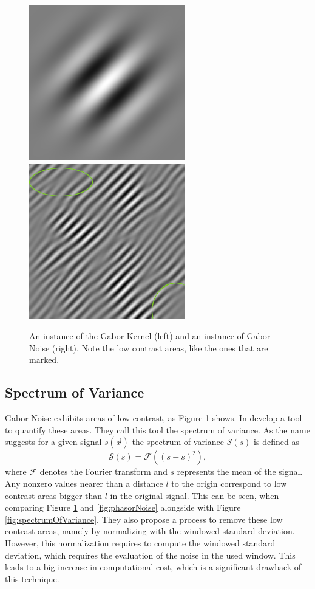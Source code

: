 \documentclass{utue} %
\begin{document}
\begin{figure}[ht]
  \centering
  \includegraphics[width=0.49\linewidth]{images/gaborKernel}
  \includegraphics[width=0.49\linewidth]{images/gaborNoise}
  \caption{An instance of the Gabor Kernel (left) and an instance of Gabor Noise (right). Note the low contrast areas, like the ones that are marked.}\label{fig:gaborNoise}

\end{figure}

\subsection{Spectrum of Variance}
Gabor Noise exhibits areas of low contrast, as Figure \ref{fig:gaborNoise} shows. In \cite{spectrumOfVariance} \citeauthor{spectrumOfVariance} develop a tool to quantify these areas. They call this tool the spectrum of variance. As the name suggests for a given signal $s(\vec{x})$ the spectrum of variance $\mathcal{S}(s)$ is defined as
$$
\mathcal{S}(s) = \mathcal{F}((s-\overline{s})^2),
$$
where $\mathcal{F}$ denotes the Fourier transform and $\overline{s}$ represents the mean of the signal. Any nonzero values nearer than a distance $l$ to the origin correspond to low contrast areas bigger than $l$ in the original signal. This can be seen, when comparing Figure \ref{fig:gaborNoise} and \ref{fig:phasorNoise} alongside with Figure \ref{fig:spectrumOfVariance}. They also propose a process to remove these low contrast areas, namely by normalizing with the windowed standard deviation. However, this normalization requires to compute the windowed standard deviation, which requires the evaluation of the noise in the used window. This leads to a big increase in computational cost, which is a significant drawback of this technique.
\end{document}
